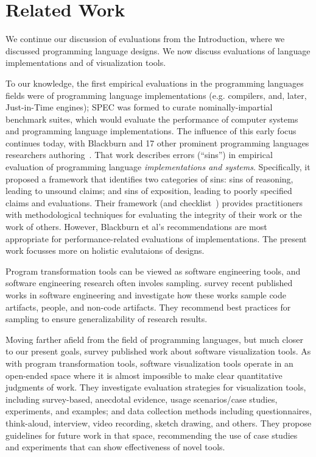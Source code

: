 \section{Related Work}
\label{sec:related}
We continue our discussion of evaluations from the Introduction, where we 
discussed programming language designs. We now
discuss evaluations of language implementations and of visualization
tools.

To our knowledge, the first empirical evaluations in the programming
languages fields were of programming language implementations
(e.g. compilers, and, later, Just-in-Time engines); 
SPEC was formed to curate nominally-impartial benchmark suites,
which would evaluate the performance of
computer systems and programming language implementations. 
The influence of this early focus continues
today, with Blackburn and 17 other prominent programming languages
researchers
authoring~\cite{blackburn16:_truth_whole_truth_nothin_but_truth}. That
work describes errors (``sins'') in empirical evaluation of programming
language \emph{implementations and systems}.  Specifically, it proposed a
framework that identifies two categories of sins: sins of reasoning,
leading to unsound claims; and sins of exposition, leading to poorly
specified claims and evaluations. Their framework (and 
checklist~\cite{berger19:_check_manif_empir_evaluat}) provides
practitioners with methodological techniques for evaluating the
integrity of their work or the work of others.  However, Blackburn et al's
recommendations are most appropriate for
performance-related evaluations of implementations. 
The present work focusses more on holistic
evalutaions of designs.

Program transformation tools can be viewed as software engineering
tools, and software engineering research often involes sampling. 
 survey recent
published works in software engineering and investigate how these works sample code
artifacts, people, and non-code artifacts.  They recommend best
practices for sampling to ensure generalizability of research results.

Moving farther afield from the field of programming languages, but
much closer to our present goals,
 survey
published work about software visualization tools. As with
program transformation tools, software visualization tools operate in
an open-ended space where it is almost impossible to make clear
quantitative judgments of work. They investigate evaluation strategies
for visualization tools, including survey-based, anecdotal evidence,
usage scenarios/case studies, experiments, and examples; and data
collection methods including questionnaires, think-aloud, interview,
video recording, sketch drawing, and others. They propose guidelines
for future work in that space, recommending the use of case studies
and experiments that can show effectiveness of novel tools.

